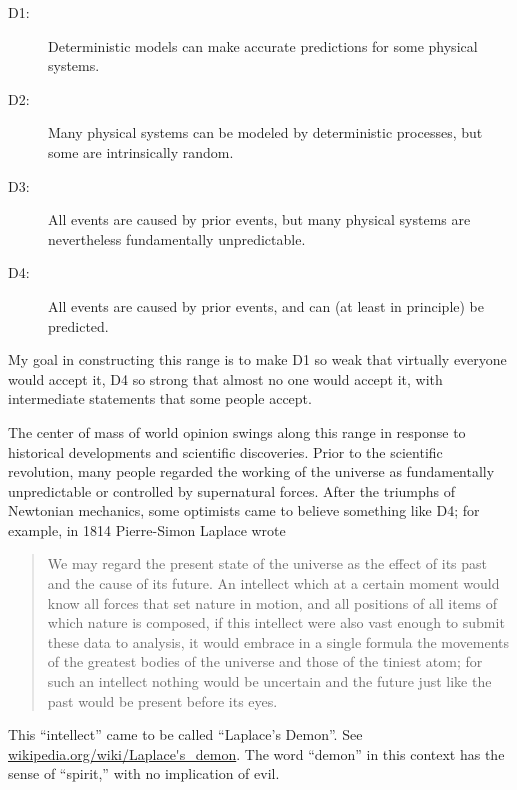 \documentclass[10pt]{book}
\begin{document}
\begin{description}

\item[D1:] Deterministic models can make accurate predictions
for some physical systems.

\item[D2:] Many physical systems can be modeled by deterministic
processes, but some are intrinsically random.

\item[D3:] All events are caused by prior events, but many
physical systems are nevertheless fundamentally unpredictable.

\item[D4:] All events are caused by prior events, and can (at
least in principle) be predicted.

\end{description}

My goal in constructing this range is to make D1 so weak that
virtually everyone would accept it, D4 so strong that almost no one
would accept it, with intermediate statements that some people accept.

The center of mass of world opinion swings along this range in
response to historical developments and scientific discoveries.  Prior
to the scientific revolution, many people regarded the working of the
universe as fundamentally unpredictable or controlled by supernatural
forces.  After the triumphs of Newtonian mechanics, some optimists
came to believe something like D4; for example, in 1814 Pierre-Simon
Laplace wrote

\begin{quote}
We may regard the present state of the universe as the effect of its
past and the cause of its future. An intellect which at a certain
moment would know all forces that set nature in motion, and all
positions of all items of which nature is composed, if this intellect
were also vast enough to submit these data to analysis, it would
embrace in a single formula the movements of the greatest bodies of
the universe and those of the tiniest atom; for such an intellect
nothing would be uncertain and the future just like the past would be
present before its eyes.
\end{quote}

This ``intellect'' came to be called ``Laplace's Demon''.
See \url{wikipedia.org/wiki/Laplace's_demon}.  The word
``demon'' in this context has the sense of ``spirit,'' with no
implication of evil.
\end{document}
